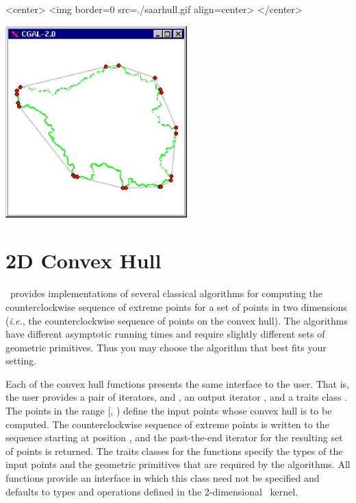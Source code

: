 \begin{ccHtmlOnly}
<center>
<img border=0 src=./saarhull.gif align=center>
</center>
\end{ccHtmlOnly} 

\begin{ccTexOnly}
\begin{center}
\includegraphics[width=7cm]{saarhull.eps}
\end{center}
\end{ccTexOnly}

\section{2D Convex Hull}
\cgal\ provides implementations of several classical algorithms for
computing the counterclockwise sequence of extreme points for a set of 
points in two dimensions (\textit{i.e.}, the counterclockwise sequence 
of points on the convex hull).  The algorithms have different asymptotic
running times and require slightly different sets of geometric primitives. 
Thus you may choose the algorithm that best fits your setting.

Each of the convex hull functions presents the same interface to the
user.  That is, the user provides a pair of iterators, 
and , an output iterator ,  and a traits class
. The points in the range [, ) define
the input points whose convex hull is to be computed.  The counterclockwise
sequence of extreme points is written to the sequence starting at position
, and the past-the-end iterator for the resulting set of
points is returned.  The traits classes for the functions specify the types
of the input points and the geometric primitives that are required by
the algorithms. All functions provide an interface in which this
class need not be specified and defaults to types and operations defined
in the 2-dimensional \cgal\ kernel.

